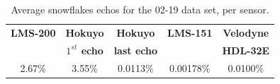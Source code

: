 \begin{table}[htbp]
    \centering
    \begin{tabular}{|c|c|c|c|c|}
        \hline
        \textbf{LMS-200}       & \textbf{Hokuyo}             & \textbf{Hokuyo}    & \textbf{LMS-151}  & \textbf{Velodyne}  \\
                                        & \textbf{$1^{st}$ echo}   & \textbf{last echo}  &                            & \textbf{HDL-32E}  \\\hline
                 2.67\%            &           3.55\%                &       0.0113\%      &       0.00178\%     &  0.0100\%  \\\hline
    \end{tabular}
    \caption{Average snowflakes echos for the 02-19 data set, per sensor.}
    \label{tab:avgRates}
\end{table}






